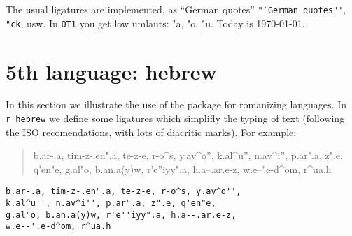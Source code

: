 \documentclass{book}
\begin{document}
The usual ligatures are implemented, as "`German quotes"'
\verb="`German quotes"'=, \verb="ck=, usw.
In \verb=OT1= you get low umlauts:
"a, "o, "u. Today  is \today.

\section{5th language: hebrew}

In this section we illustrate the use of the package
for romanizing languages. In \verb=r_hebrew= we define
some ligatures which simplifly the typing of text (following
the ISO recomendations, with lots of diacritic marks). For example:
\let\k\c
\begin{quote}
b.ar-.a, tim-z-.en".a, te-z-e, r-o^s, y.av^o'', k.al^u'', n.av^i'',
p.ar".a, z".e, q'en"e, g.al"o, b.an.a(y)w, r'e''iyy".a, h.a--.ar.e-z,
w.e--'.e-d^om, r^ua.h
\end{quote}
\begin{verbatim}
b.ar-.a, tim-z-.en".a, te-z-e, r-o^s, y.av^o'',
k.al^u'', n.av^i'', p.ar".a, z".e, q'en"e,
g.al"o, b.an.a(y)w, r'e''iyy".a, h.a--.ar.e-z,
w.e--'.e-d^om, r^ua.h
\end{verbatim}
\end{document}
